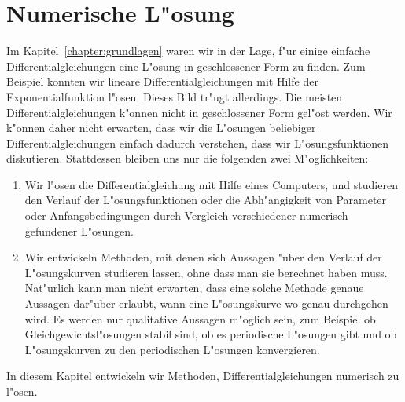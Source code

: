 %
%
%
\chapter{Numerische L"osung\label{chapter:numerik}}
\lhead{}
Im Kapitel~\ref{chapter:grundlagen} waren wir in der Lage, f"ur einige
einfache Differentialgleichungen eine L"osung in geschlossener Form
zu finden.
Zum Beispiel konnten wir lineare Differentialgleichungen mit Hilfe
der Exponentialfunktion l"osen.
Dieses Bild tr"ugt allerdings.
Die meisten Differentialgleichungen k"onnen nicht in geschlossener
Form gel"ost werden.
Wir k"onnen daher nicht erwarten, dass wir die L"osungen beliebiger
Differentialgleichungen einfach dadurch verstehen, dass wir
L"osungsfunktionen diskutieren.
Stattdessen bleiben uns nur die folgenden zwei M"oglichkeiten:
\begin{enumerate}
\item
Wir l"osen die Differentialgleichung mit Hilfe eines Computers,
und studieren den Verlauf der L"osungsfunktionen oder die Abh"angigkeit
von Parameter oder Anfangsbedingungen durch Vergleich verschiedener
numerisch gefundener L"osungen.
\item
Wir entwickeln Methoden, mit denen sich Aussagen "uber den Verlauf der
L"osungskurven studieren lassen, ohne dass man sie berechnet haben muss.
Nat"urlich kann man nicht erwarten, dass eine solche Methode genaue
Aussagen dar"uber erlaubt, wann eine L"osungskurve wo genau durchgehen
wird.
Es werden nur qualitative Aussagen m"oglich sein, zum Beispiel ob
Gleichgewichtsl"osungen stabil sind, ob es periodische L"osungen gibt
und ob L"osungskurven zu den periodischen L"osungen konvergieren.
\end{enumerate}
In diesem Kapitel entwickeln wir Methoden, Differentialgleichungen 
numerisch zu l"osen.

